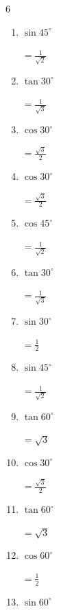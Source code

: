 \begin{multicols}{6}
\begin{enumerate}
  \item $\displaystyle \sin{45^\circ}$

        $\displaystyle =\frac{1}{\sqrt{2}}$

  \item $\displaystyle \tan{30^\circ}$

        $\displaystyle =\frac{1}{\sqrt{3}}$

  \item $\displaystyle \cos{30^\circ}$

        $\displaystyle =\frac{\sqrt{3}}{2}$

  \item $\displaystyle \cos{30^\circ}$

        $\displaystyle =\frac{\sqrt{3}}{2}$

  \item $\displaystyle \cos{45^\circ}$

        $\displaystyle =\frac{1}{\sqrt{2}}$

  \item $\displaystyle \tan{30^\circ}$

        $\displaystyle =\frac{1}{\sqrt{3}}$

  \item $\displaystyle \sin{30^\circ}$

        $\displaystyle =\frac{1}{2}$

  \item $\displaystyle \sin{45^\circ}$

        $\displaystyle =\frac{1}{\sqrt{2}}$

  \item $\displaystyle \tan{60^\circ}$

        $\displaystyle =\sqrt{3}$

  \item $\displaystyle \cos{30^\circ}$

        $\displaystyle =\frac{\sqrt{3}}{2}$

  \item $\displaystyle \tan{60^\circ}$

        $\displaystyle =\sqrt{3}$

\columnbreak %

\resetques

  \item $\displaystyle \cos{60^\circ}$

        $\displaystyle =\frac{1}{2}$

  \item $\displaystyle \sin{60^\circ}$


\end{enumerate}
\end{multicols}
